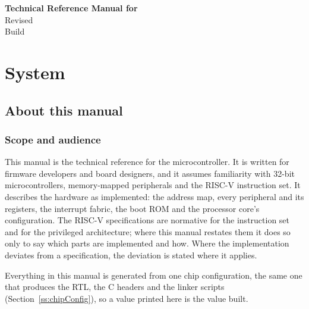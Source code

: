 \documentclass[11pt,pdftex,openany,letterpaper]{report}
\begin{document}
\vspace*{30ex}
\begin{center}
	\textbf{Technical Reference Manual for \AsicNameForUserGuide} \\
	\vspace{2ex}
	Revised \RevisionDateFull \\
	\vspace{1ex}
	{\small Build \texttt{\BuildHash}}
\end{center}

\newpage

\tableofcontents
\clearpage

{}
\listoffigures
\clearpage

{}
\listoftables
\clearpage



\part{System}

\chapter{About this manual} \label{s:about}

\section{Scope and audience}

This manual is the technical reference for the \AsicNameForUserGuide{} microcontroller. It is written for firmware developers and board designers, and it assumes familiarity with 32-bit microcontrollers, memory-mapped peripherals and the RISC-V instruction set. It describes the hardware as implemented: the address map, every peripheral and its registers, the interrupt fabric, the boot ROM and the processor core's configuration. The RISC-V specifications are normative for the instruction set and for the privileged architecture; where this manual restates them it does so only to say which parts are implemented and how. Where the implementation deviates from a specification, the deviation is stated where it applies.

Everything in this manual is generated from one chip configuration, the same one that produces the RTL, the C headers and the linker scripts (Section~\ref{ss:chipConfig}), so a value printed here is the value built.
\end{document}

